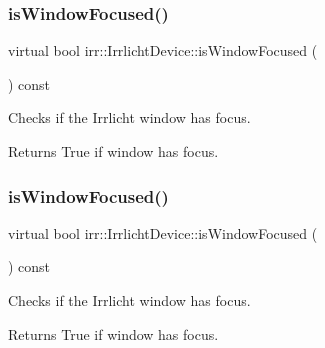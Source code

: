\subsubsection{\texorpdfstring{is\+Window\+Focused()}{isWindowFocused()}\hspace{0.1cm}{\footnotesize\ttfamily [1/2]}}
{\footnotesize\ttfamily virtual bool irr\+::\+Irrlicht\+Device\+::is\+Window\+Focused (\begin{DoxyParamCaption}{ }\end{DoxyParamCaption}) const\hspace{0.3cm}{\ttfamily [pure virtual]}}



Checks if the Irrlicht window has focus. 

\begin{DoxyReturn}{Returns}
True if window has focus. 
\end{DoxyReturn}
\mbox{\label{classirr_1_1IrrlichtDevice_a960069dc52b4f1303d18945dcbad7f3a}} 
\subsubsection{\texorpdfstring{is\+Window\+Focused()}{isWindowFocused()}\hspace{0.1cm}{\footnotesize\ttfamily [2/2]}}
{\footnotesize\ttfamily virtual bool irr\+::\+Irrlicht\+Device\+::is\+Window\+Focused (\begin{DoxyParamCaption}{ }\end{DoxyParamCaption}) const\hspace{0.3cm}{\ttfamily [pure virtual]}}



Checks if the Irrlicht window has focus. 

\begin{DoxyReturn}{Returns}
True if window has focus. 
\end{DoxyReturn}
\mbox{\label{classirr_1_1IrrlichtDevice_a69e96b9c49c65391e406377a92e795b1}} 
